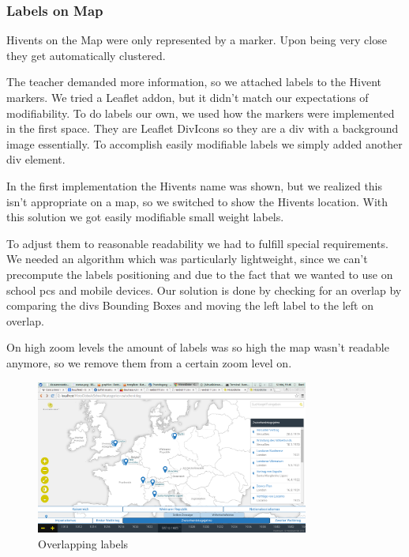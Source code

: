 \subsubsection{Labels on Map}
Hivents on the Map were only represented by a marker.
Upon being very close they get automatically clustered.

The teacher demanded more information, so we attached labels to the Hivent markers.
We tried a Leaflet addon, but it didn't match our expectations of modifiability.
To do labels our own, we used how the markers were implemented in the first space. They are Leaflet DivIcons so they are a div with a background image essentially. To accomplish easily modifiable labels we simply added another div element.

In the first implementation the Hivents name was shown, but we realized this isn't appropriate on a map, so we switched to show the Hivents location. With this solution we got easily modifiable small weight labels.

To adjust them to reasonable readability we had to fulfill special requirements.
We needed an algorithm which was  particularly lightweight, since we can't precompute the labels positioning and due to the fact that we wanted to use \HG on school pcs and mobile devices.
Our solution is done by checking for an overlap by comparing the divs Bounding Boxes and moving the left label to the left on overlap.

On high zoom levels the amount of labels was so high the map wasn't readable anymore, so we remove them from a certain zoom level on.

  \begin{figure}[H]
\begin{center}
  \includegraphics[width=0.8\textwidth]{graphics/overlapping_labels.png}
  \end{center}

  \caption{Overlapping labels}
  \label{fig:overlapping_labels}
  \end{figure}

